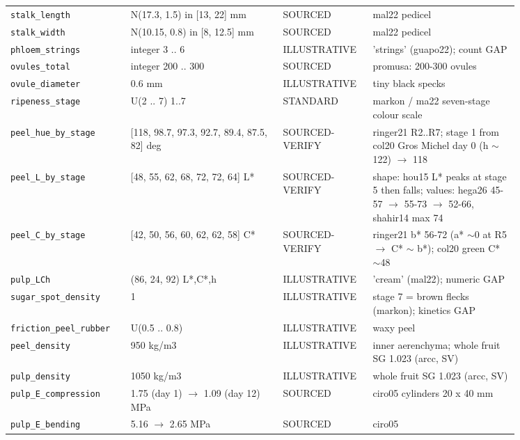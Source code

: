 \documentclass[10.5pt,a4paper]{article}
\begin{document}
{\begin{longtable}{@{}p{0.2\linewidth}p{0.27\linewidth}p{0.12\linewidth}p{0.26\linewidth}@{}}
\texttt{stalk\_\allowbreak{}length} & N(17.3, 1.5) in [13, 22] mm & SOURCED & mal22 pedicel \\
\texttt{stalk\_\allowbreak{}width} & N(10.15, 0.8) in [8, 12.5] mm & SOURCED & mal22 pedicel \\
\texttt{phloem\_\allowbreak{}strings} & integer 3 .. 6 & ILLUSTRATIVE & 'strings' (guapo22); count GAP \\
\texttt{ovules\_\allowbreak{}total} & integer 200 .. 300 & SOURCED & promusa: 200-300 ovules \\
\texttt{ovule\_\allowbreak{}diameter} & 0.6 mm & ILLUSTRATIVE & tiny black specks \\
\texttt{ripeness\_\allowbreak{}stage} & U(2 .. 7) 1..7 & STANDARD & markon / ma22 seven-stage colour scale \\
\texttt{peel\_\allowbreak{}hue\_\allowbreak{}by\_\allowbreak{}stage} & [118, 98.7, 97.3, 92.7, 89.4, 87.5, 82] deg & SOURCED-VERIFY & ringer21 R2..R7; stage 1 from col20 Gros Michel day 0 (h $\sim$122) $\to$ 118 \\
\texttt{peel\_\allowbreak{}L\_\allowbreak{}by\_\allowbreak{}stage} & [48, 55, 62, 68, 72, 72, 64] L* & SOURCED-VERIFY & shape: hou15 L* peaks at stage 5 then falls; values: hega26 45-57 $\to$ 55-73 $\to$ 52-66, shahir14 max 74 \\
\texttt{peel\_\allowbreak{}C\_\allowbreak{}by\_\allowbreak{}stage} & [42, 50, 56, 60, 62, 62, 58] C* & SOURCED-VERIFY & ringer21 b* 56-72 (a* $\sim$0 at R5 $\to$ C* $\sim$ b*); col20 green C* $\sim$48 \\
\texttt{pulp\_\allowbreak{}LCh} & (86, 24, 92) L*,C*,h & ILLUSTRATIVE & 'cream' (mal22); numeric GAP \\
\texttt{sugar\_\allowbreak{}spot\_\allowbreak{}density} & 1 & ILLUSTRATIVE & stage 7 = brown flecks (markon); kinetics GAP \\
\texttt{friction\_\allowbreak{}peel\_\allowbreak{}rubber} & U(0.5 .. 0.8) & ILLUSTRATIVE & waxy peel \\
\texttt{peel\_\allowbreak{}density} & 950 kg/m3 & ILLUSTRATIVE & inner aerenchyma; whole fruit SG 1.023 (arcc, SV) \\
\texttt{pulp\_\allowbreak{}density} & 1050 kg/m3 & ILLUSTRATIVE & whole fruit SG 1.023 (arcc, SV) \\
\texttt{pulp\_\allowbreak{}E\_\allowbreak{}compression} & 1.75 (day 1) $\to$ 1.09 (day 12) MPa & SOURCED & ciro05 cylinders 20 x 40 mm \\
\texttt{pulp\_\allowbreak{}E\_\allowbreak{}bending} & 5.16 $\to$ 2.65 MPa & SOURCED & ciro05 \\

\end{longtable}}
\end{document}
